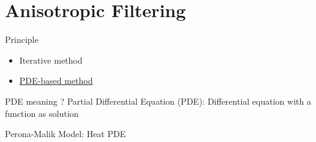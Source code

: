 \section{Anisotropic Filtering}
\frame{\sectionpage}

\begin{frame}{Principle}

\begin{itemize}
\item Iterative method
\item \href{https://en.wikipedia.org/wiki/Partial_differential_equation}{PDE-based method}
\end{itemize}

\end{frame}

\begin{frame}{PDE meaning ?}
Partial Differential Equation (PDE): Differential equation with a function as solution
\end{frame}

\begin{frame}{Perona-Malik Model: Heat PDE}

\end{frame}

